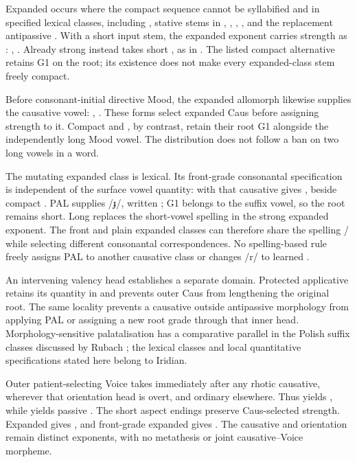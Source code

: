 Expanded  occurs where the compact sequence cannot be
syllabified and in specified lexical classes, including ,
stative stems in , , , , and the
replacement antipassive . With a short input stem, the
expanded exponent carries strength as :
, . Already strong 
instead takes short , as in .
The listed compact alternative  retains G1 on the root;
its existence does not make every expanded-class stem freely compact.

Before consonant-initial directive Mood, the expanded allomorph likewise
supplies the causative vowel: , .
These forms select expanded Caus before assigning strength to it.
Compact  and , by contrast, retain
their root G1 alongside the independently long Mood vowel. The distribution
does not follow a ban on two long vowels in a word.

The mutating expanded class is lexical. Its front-grade consonantal
specification is independent of the surface vowel quantity:
 with that causative gives , beside compact
. PAL supplies /ɟ/, written ; G1 belongs to
the suffix vowel, so the root remains short. Long  replaces
the short-vowel spelling  in the strong expanded exponent.
The front and plain expanded classes can therefore share the spelling
/ while selecting different consonantal
correspondences. No spelling-based rule freely assigns PAL to another
causative class or changes /r/ to learned .

An intervening valency head establishes a separate domain. Protected
applicative  retains its quantity in 
and prevents outer Caus from lengthening the original root. The same
locality prevents a causative outside antipassive morphology from applying
PAL or assigning a new root grade through that inner head.
Morphology-sensitive palatalisation has a comparative parallel in the Polish
suffix classes discussed by Rubach \cite[§§2--3]{rubach2019}; the lexical
classes and local quantitative specifications stated here belong to Iridian.

Outer patient-selecting Voice takes  immediately after any
rhotic causative, wherever that orientation head is overt, and ordinary
 elsewhere. Thus  yields
, while  yields passive
. The short aspect endings preserve Caus-selected
strength. Expanded  gives ,
and front-grade expanded  gives .
The causative and orientation remain distinct exponents, with no metathesis
or joint causative--Voice morpheme.

